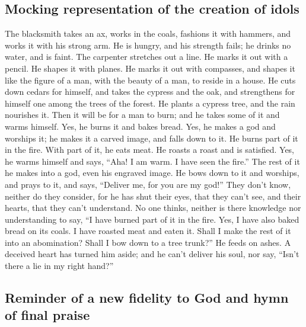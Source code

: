 \hypertarget{mocking-representation-of-the-creation-of-idols}{%
\subsection{Mocking representation of the creation of
idols}\label{mocking-representation-of-the-creation-of-idols}}

 The blacksmith takes an ax, works in the coals, fashions
it with hammers, and works it with his strong arm. He is hungry, and his
strength fails; he drinks no water, and is faint.  The
carpenter stretches out a line. He marks it out with a pencil. He shapes
it with planes. He marks it out with compasses, and shapes it like the
figure of a man, with the beauty of a man, to reside in a house.
 He cuts down cedars for himself, and takes the cypress
and the oak, and strengthens for himself one among the trees of the
forest. He plants a cypress tree, and the rain nourishes it.
 Then it will be for a man to burn; and he takes some of
it and warms himself. Yes, he burns it and bakes bread. Yes, he makes a
god and worships it; he makes it a carved image, and falls down to it.
 He burns part of it in the fire. With part of it, he
eats meat. He roasts a roast and is satisfied. Yes, he warms himself and
says, ``Aha! I am warm. I have seen the fire.''  The rest
of it he makes into a god, even his engraved image. He bows down to it
and worships, and prays to it, and says, ``Deliver me, for you are my
god!''  They don't know, neither do they consider, for he
has shut their eyes, that they can't see, and their hearts, that they
can't understand.  No one thinks, neither is there
knowledge nor understanding to say, ``I have burned part of it in the
fire. Yes, I have also baked bread on its coals. I have roasted meat and
eaten it. Shall I make the rest of it into an abomination? Shall I bow
down to a tree trunk?''  He feeds on ashes. A deceived
heart has turned him aside; and he can't deliver his soul, nor say,
``Isn't there a lie in my right hand?''

\hypertarget{reminder-of-a-new-fidelity-to-god-and-hymn-of-final-praise}{%
\subsection{Reminder of a new fidelity to God and hymn of final
praise}\label{reminder-of-a-new-fidelity-to-god-and-hymn-of-final-praise}}

